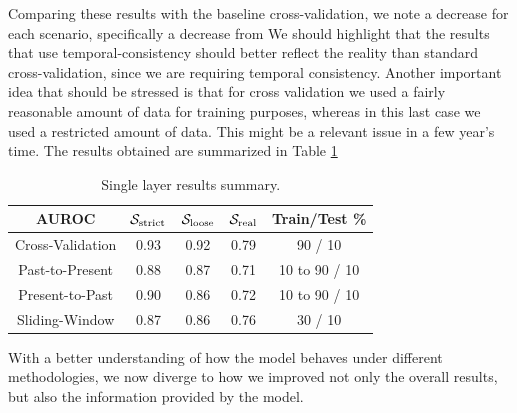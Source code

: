 Comparing these results with the baseline cross-validation, we note a decrease for each scenario, specifically a decrease from 
We should highlight that the results that use temporal-consistency should better reflect the reality than standard cross-validation, since we are requiring temporal consistency.
Another important idea that should be stressed is that for cross validation we used a fairly reasonable amount of data for training purposes, whereas in this last case we used a restricted amount of data. This might be a relevant issue in a few year's time. The results obtained are summarized in Table \ref{tab:singlelayer_results}

\begin{table}[!htb]
	\renewcommand{\arraystretch}{1.2} %
	\centering
	\begin{tabular}{ccccc}
	\hline AUROC & $\mathcal{S}_{\mathrm{strict}}$ & $\mathcal{S}_{\mathrm{loose}}$ & $\mathcal{S}_{\mathrm{real}}$ & Train/Test \%\\
	\hline Cross-Validation & 0.93 & 0.92 & 0.79 & 90 / 10\\
	\hline Past-to-Present & 0.88 & 0.87 & 0.71 & 10 to 90 / 10\\
	\hline Present-to-Past & 0.90 & 0.86 & 0.72 & 10 to 90 / 10\\
	\hline Sliding-Window & 0.87 & 0.86 & 0.76 & 30 / 10\\
	\hline
\end{tabular}
\caption{Single layer results summary.}
\label{tab:singlelayer_results}
\end{table}

\medskip

With a better understanding of how the model behaves under different methodologies, we now diverge to how we improved not only the overall results, but also the information provided by the model.
